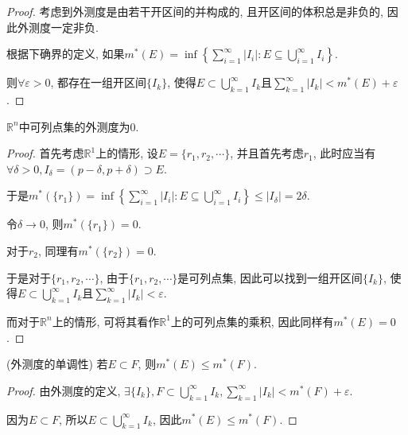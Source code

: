 \documentclass[theorem=false,mathfont=none,openany,sub3section]{easybook}
\begin{document}
\begin{proof}
  考虑到外测度是由若干开区间的并构成的, 且开区间的体积总是非负的, 因此外测度一定非负.\par
  根据下确界的定义, 如果$m^{*}(E)=\inf\left\{\sum_{i=1}^{\infty}|I_i|: E\subseteq \bigcup_{i=1}^{\infty}I_i\right\}$.\par
  则$\forall \varepsilon >0$, 都存在一组开区间$\{I_k\}$, 使得$E\subset \bigcup_{k=1}^{\infty}I_k$且$\sum_{k=1}^{\infty}|I_k|<m^{*}(E)+\varepsilon$.\par
\end{proof}

\begin{corollary}
  $\mathbb{R}^n$中可列点集的外测度为0.\par
\end{corollary}

\begin{proof}
  首先考虑$\mathbb{R}^1$上的情形, 设$E=\{r_1,r_2,\cdots\}$, 并且首先考虑$r_1$, 此时应当有$\forall \delta >0, I_{\delta} = (p-\delta,p+\delta)\supset E$.\par
  于是$m^{*}(\{r_1\})=\inf\left\{\sum_{i=1}^{\infty}|I_i|: E\subseteq \bigcup_{i=1}^{\infty}I_i\right\}\leqslant |I_{\delta}|=2\delta.$\par
  令$\delta \to 0$, 则$m^{*}(\{r_1\})=0$.\par
  对于$r_2$, 同理有$m^{*}(\{r_2\})=0$.\par
  于是对于$\{r_1,r_2,\cdots\}$, 由于$\{r_1,r_2,\cdots\}$是可列点集, 因此可以找到一组开区间$\{I_k\}$, 使得$E\subset \bigcup_{k=1}^{\infty}I_k$且$\sum_{k=1}^{\infty}|I_k|<\varepsilon$.\par
  而对于$\mathbb{R}^n$上的情形, 可将其看作$\mathbb{R}^1$上的可列点集的乘积, 因此同样有$m^{*}(E)=0$.\par
\end{proof}

\begin{proposition}
  (外测度的单调性) 若$E\subset F$, 则$m^{*}(E)\leqslant m^{*}(F)$.\par
\end{proposition}

\begin{proof}
  由外测度的定义, $\exists \{I_k\}, F\subset \bigcup_{k=1}^{\infty}I_k, \sum_{k=1}^{\infty}|I_k|<m^{*}(F)+\varepsilon$.\par
  因为$E\subset F$, 所以$E\subset \bigcup_{k=1}^{\infty}I_k$, 因此$m^{*}(E)\leqslant m^{*}(F)$.\par
\end{proof}
\end{document}
